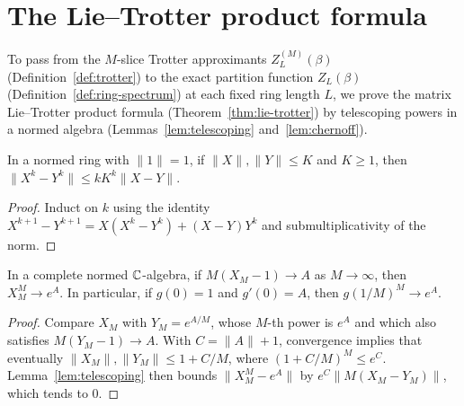 \section{The Lie--Trotter product formula}

To pass from the \(M\)-slice Trotter approximants \(Z^{(M)}_L(\beta)\) (Definition~\ref{def:trotter})
to the exact partition function \(Z_L(\beta)\) (Definition~\ref{def:ring-spectrum}) at each fixed
ring length \(L\), we prove the matrix Lie--Trotter product formula (Theorem~\ref{thm:lie-trotter})
by telescoping powers in a normed algebra (Lemmas~\ref{lem:telescoping} and~\ref{lem:chernoff}).

\begin{lemma}
  \label{lem:telescoping}
  \leanok
  In a normed ring with \(\|1\| = 1\), if \(\|X\|, \|Y\| \le K\) and \(K \ge 1\), then
  \(\|X^k - Y^k\| \le k K^k \|X - Y\|\).
\end{lemma}
\begin{proof}
  \leanok
  Induct on \(k\) using the identity \(X^{k+1} - Y^{k+1} = X (X^k - Y^k) + (X - Y) Y^k\) and
  submultiplicativity of the norm.
\end{proof}

\begin{lemma}
  \label{lem:chernoff}
  \leanok
  In a complete normed \(\mathbb{C}\)-algebra, if \(M (X_M - 1) \to A\) as \(M \to \infty\), then
  \(X_M^M \to e^A\). In particular, if \(g(0) = 1\) and \(g'(0) = A\), then
  \(g(1/M)^M \to e^A\).
\end{lemma}
\begin{proof}
  \leanok
  Compare \(X_M\) with \(Y_M = e^{A/M}\), whose \(M\)-th power is \(e^A\) and which also satisfies
  \(M(Y_M - 1) \to A\). With \(C = \|A\| + 1\), convergence implies that eventually
  \(\|X_M\|, \|Y_M\| \le 1 + C/M\), where \((1 + C/M)^M \le e^C\). Lemma~\ref{lem:telescoping} then
  bounds \(\|X_M^M - e^A\|\) by \(e^C \|M (X_M - Y_M)\|\), which tends to \(0\).
\end{proof}

